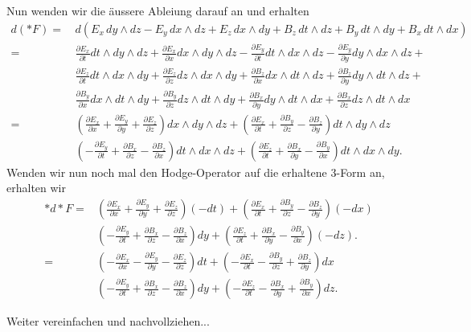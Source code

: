 Nun wenden wir die äussere Ableiung darauf an und erhalten
\begin{align*}
	d(\ast F) = \,
	& d (E_{x} \, dy \wedge dz - E_{y} \, dx \wedge dz + E_{z} \, dx \wedge dy + B_z \, dt \wedge dz + B_y \, dt \wedge dy + B_x \, dt \wedge dx)\\
	=
	& \frac{\partial E_x}{\partial t} dt \wedge dy \wedge dz + \frac{\partial E_x}{\partial x} dx \wedge dy \wedge dz -
	\frac{\partial E_y}{\partial t} dt \wedge dx \wedge dz -
	\frac{\partial E_y}{\partial y} dy \wedge dx \wedge dz +\\
	& \frac{\partial E_z}{\partial t} dt \wedge dx \wedge dy +
	\frac{\partial E_z}{\partial z} dz \wedge dx \wedge dy +
	\frac{\partial B_z}{\partial x} dx \wedge dt \wedge dz +
	\frac{\partial B_z}{\partial y} dy \wedge dt \wedge dz +\\
	& \frac{\partial B_y}{\partial x} dx \wedge dt \wedge dy +
	\frac{\partial B_y}{\partial z} dz \wedge dt \wedge dy +
	\frac{\partial B_x}{\partial y} dy \wedge dt \wedge dx +
	\frac{\partial B_x}{\partial z} dz \wedge dt \wedge dx\\
	=
	&\left( \frac{\partial E_x}{\partial x} + \frac{\partial E_y}{\partial y} + \frac{\partial E_z}{\partial z} \right) dx \wedge dy \wedge dz +
	\left(\frac{\partial E_x}{\partial t} + \frac{\partial B_y}{\partial z} - \frac{\partial B_z}{\partial y} \right) dt \wedge dy \wedge dz\\
	&\left( -\frac{\partial E_y}{\partial t} + \frac{\partial B_x}{\partial z} - \frac{\partial B_z}{\partial x} \right) dt \wedge dx \wedge dz +
	\left( \frac{\partial E_z}{\partial t} + \frac{\partial B_x}{\partial y} - \frac{\partial B_y}{\partial x} \right) dt \wedge dx \wedge dy. 
\end{align*}
Wenden wir nun noch mal den Hodge-Operator auf die erhaltene 3-Form an, erhalten wir
\begin{align*}
	\ast d \ast F = 
	&\left( \frac{\partial E_x}{\partial x} + \frac{\partial E_y}{\partial y} + \frac{\partial E_z}{\partial z} \right) (-dt) +
	\left(\frac{\partial E_x}{\partial t} + \frac{\partial B_y}{\partial z} - \frac{\partial B_z}{\partial y} \right) (-dx)\\
	&\left( -\frac{\partial E_y}{\partial t} + \frac{\partial B_x}{\partial z} - \frac{\partial B_z}{\partial x} \right) dy +
	\left( \frac{\partial E_z}{\partial t} + \frac{\partial B_x}{\partial y} - \frac{\partial B_y}{\partial x} \right) (-dz).\\
	=
	&\left( -\frac{\partial E_x}{\partial x} -\frac{\partial E_y}{\partial y} - \frac{\partial E_z}{\partial z} \right) dt +
	\left(-\frac{\partial E_x}{\partial t} - \frac{\partial B_y}{\partial z} + \frac{\partial B_z}{\partial y} \right) dx\\
	&\left( -\frac{\partial E_y}{\partial t} + \frac{\partial B_x}{\partial z} - \frac{\partial B_z}{\partial x} \right) dy +
	\left( -\frac{\partial E_z}{\partial t} - \frac{\partial B_x}{\partial y} + \frac{\partial B_y}{\partial x} \right) dz.
\end{align*}

Weiter vereinfachen und nachvollziehen...
